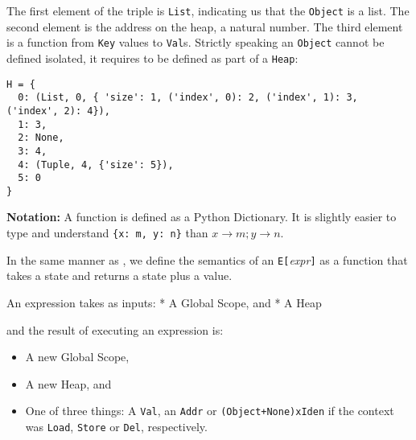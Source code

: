 The first element of the triple is \texttt{List}, indicating us that the
\texttt{Object} is a list. The second element is the address on the
heap, a natural number. The third element is a function from
\texttt{Key} values to \texttt{Val}s. Strictly speaking an
\texttt{Object} cannot be defined isolated, it requires to be defined as
part of a \texttt{Heap}:

\begin{verbatim}
H = {
  0: (List, 0, { 'size': 1, ('index', 0): 2, ('index', 1): 3, ('index', 2): 4}),
  1: 3,
  2: None,
  3: 4,
  4: (Tuple, 4, {'size': 5}),
  5: 0
}
\end{verbatim}

\textbf{Notation:} A function is defined as a Python Dictionary. It is
slightly easier to type and understand \texttt{\{x:\ m,\ y:\ n\}} than
\(x \rightarrow m; y \rightarrow n\).

{}

In the same manner as \textcite{fromherz_static_2018}, we define the
semantics of an \texttt{E{[}}\emph{expr}\texttt{{]}} as a function that
takes a state and returns a state plus a value.

An expression takes as inputs: * A Global Scope, and * A Heap

and the result of executing an expression is:

\begin{itemize}
\tightlist
\item
  A new Global Scope,
\item
  A new Heap, and
\item
  One of three things: A \texttt{Val}, an \texttt{Addr} or
  \texttt{(Object+None)xIden} if the context was \texttt{Load},
  \texttt{Store} or \texttt{Del}, respectively.
\end{itemize}

{}

